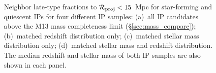 \begin{figure}
  \epstrim{0.1in 0.3in 0.4in 0.8in}
  \caption{Neighbor late-type fractions to ${\mathcal{R}_{\text{proj}}<15}$~Mpc for star-forming and quiescent IPs for four different IP samples: 
(a)~all IP candidates above the M13 mass completeness limit (\S\ref{sec:mass_compare});
(b)~matched redshift distribution only;
(c)~matched stellar mass distribution only;
(d)~matched stellar mass and redshift distribution.
The median redshift and stellar mass of both IP samples are also shown in each panel.
}
  \label{fig:IPsample_compare}
\end{figure}
